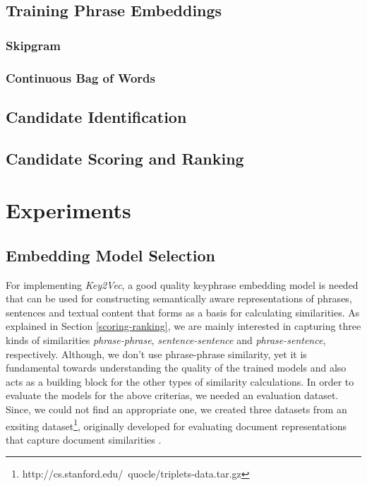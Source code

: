 \documentclass[conference]{IEEEtran}
\begin{document}
\subsection{Training Phrase Embeddings \label{training-phrase-embeddings}}

\subsubsection{Skipgram}

\subsubsection{Continuous Bag of Words}

\subsection{Candidate Identification \label{candidate-identification}}

\subsection{Candidate Scoring and Ranking \label{scoring-ranking}}

\section{Experiments \label{experiments}}


\subsection{Embedding Model Selection \label{embedding-model-selection}}
For implementing \textit{Key2Vec}, a good quality keyphrase embedding model is needed that can be used for constructing semantically aware representations of phrases, sentences and textual content that forms as a basis for calculating similarities. As explained in Section \ref{scoring-ranking}, we are mainly interested in capturing three kinds of similarities \textit{phrase-phrase}, \textit{sentence-sentence} and \textit{phrase-sentence}, respectively. Although, we don't use phrase-phrase similarity, yet it is fundamental towards understanding the quality of the trained models and also acts as a building block for the other types of similarity calculations. In order to evaluate the models for the above criterias, we needed an evaluation dataset. Since, we could not find an appropriate one, we created three datasets from an exsiting dataset\footnote{http://cs.stanford.edu/~quocle/triplets-data.tar.gz}, originally developed for evaluating document representations that capture document similarities \cite{dai2015document}.
\end{document}
